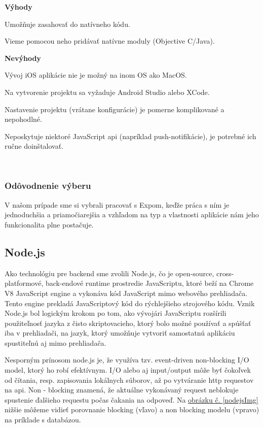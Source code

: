 {\bf Výhody}
\begin{itemize}
{\item Umožňuje zasahovať do natívneho kódu.} 
{\item Vieme pomocou neho pridávať natívne moduly (Objective C/Java).} \cite{rncli} 
\end{itemize}

{\bf Nevýhody}
\begin{itemize}
{\item Vývoj iOS aplikácie nie je možný na inom OS ako MacOS.} 
{\item Na vytvorenie projektu sa vyžaduje Android Studio alebo XCode.}
{\item Nastavenie projektu (vrátane konfigurácie) je pomerne komplikované a nepohodlné.} 
{\item Neposkytuje niektoré JavaScript \acrshort{api} (napríklad push-notifikácie), je potrebné ich ručne doinštalovať.} \cite{rncli} \\
\end{itemize}

\subsubsection{Odôvodnenie výberu}
V našom prípade sme si vybrali pracovať s Expom, keďže práca s ním je jednoduchšia a priamočiarejšia a vzhľadom na typ a vlastnosti aplikácie nám jeho funkcionalita plne postačuje. \\

\subsection{Node.js}
Ako technológiu pre backend sme zvolili Node.js, čo je open-source, cross-platformové, back-endové runtime prostredie JavaScriptu, ktoré beží na Chrome V8 JavaScript engine a vykonáva kód JavaScript mimo webového prehliadača. \cite{nodejswiki} Tento engine prekladá JavaScriptový kód do rýchlejšieho strojového kódu. Vznik Node.js bol logickým krokom po tom, ako vývojári JavaScriptu rozšírili použiteľnosť jazyka z čisto skriptovacieho, ktorý bolo možné používať a spúšťať iba v prehliadači, na jazyk, ktorý umožňuje vytvoriť samostatnú aplikáciu spustiteľnú aj mimo prehliadača. 

Nesporným prínosom node.js je, že využíva tzv. event-driven non-blocking I/O model, ktorý ho robí efektívnym. I/O alebo aj input/output môže byť čokoľvek od čítania, resp. zapisovania lokálnych súborov, až po vytváranie \acrshort{http} requestov na \acrshort{api}. Non - blocking znamená, že aktuálne vykonávaný request neblokuje spustenie ďalšieho requestu počas čakania na odpoveď. Na \hyperref[nodejsImg]{ obrázku č. \ref{nodejsImg}} nižšie môžeme vidieť porovnanie blocking (vľavo) a non blocking modelu (vpravo) na príklade s databázou. \cite{nodejs} \\

